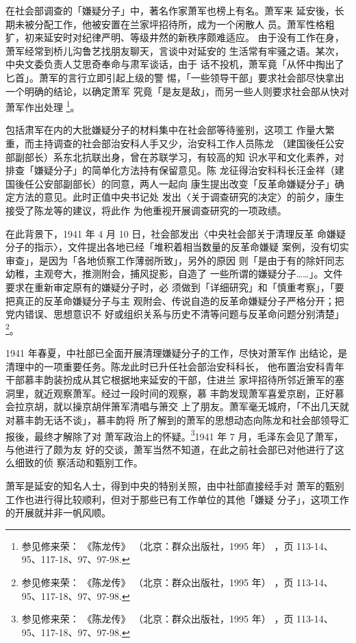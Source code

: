 在社会部调查的「嫌疑分子」中，著名作家萧军也榜上有名。萧军来
延安後，长期未被分配工作，他被安置在兰家坪招待所，成为一个闲散人
员。萧军性格粗犷，初来延安时对纪律严明、等级井然的新秩序颇难适应。
由于没有工作在身，萧军经常到桥儿沟鲁艺找朋友聊天，言谈中对延安的
生活常有牢骚之语。某次，中央文委负责人艾思奇奉命与肃军谈话，由于
话不投机，萧军竟「从怀中掏出了匕首」。萧军的言行立即引起上级的警
惕，「一些领导干部」要求社会部尽快拿出一个明确的结论，以确定萧军
究竟「是友是敌」，而另一些人则要求社会部从快对萧军作出处理
\footnote{参见修来荣：
《陈龙传》
（北京：群众出版社，1995 年）
，页 113-14、95、117-18、97、97-98.}。

包括肃军在内的大批嫌疑分子的材料集中在社会部等待鉴别，这项工
作量大繁重，而主持调查的社会部治安科人手又少，治安科工作人员陈龙
（建国後任公安部副部长）系东北抗联出身，曾在苏联学习，有较高的知
识水平和文化素养，对排查「嫌疑分子」的简单化方法持有保留意见。陈
龙征得治安科科长汪金祥（建国後任公安部副部长）的同意，两人一起向
康生提出改变「反革命嫌疑分子」确定方法的意见。此时正值中央书记处
发出〈关于调查研究的决定〉的前夕，康生接受了陈龙等的建议，将此作
为他重视开展调查研究的一项政绩。

在此背景下，1941 年 4 月 10 日，社会部发出〈中央社会部关于清理反革
命嫌疑分子的指示〉，文件提出各地已经「堆积着相当数量的反革命嫌疑
案例，没有切实审查」，是因为「各地侦察工作薄弱所致」，另外的原因
则「是由于有的除奸同志幼稚，主观夸大，推测附会，捕风捉影，自造了
一些所谓的嫌疑分子……」。文件要求在重新审定原有的嫌疑分子时，必
须做到「详细研究」和「慎重考察」，「要把真正的反革命嫌疑分子与主
观附会、传说自造的反革命嫌疑分子严格分开；把党内错误、思想意识不
好或组织关系与历史不清等问题与反革命问题分别清楚」\footnote{参见修来荣：
《陈龙传》
（北京：群众出版社，1995 年）
，页 113-14、95、117-18、97、97-98.}。

1941 年春夏，中社部已全面开展清理嫌疑分子的工作，尽快对萧军作
出结论，是清理中的一项重要任务。陈龙此时已升任社会部治安科科长，
他布置治安科青年干部慕丰韵装扮成从其它根据地来延安的干部，住进兰
家坪招待所邻近箫军的塞洞里，就近观察萧军。经过一段时间的观察，慕
丰韵发现萧军喜爱京剧，正好慕会拉京胡，就以操京胡伴箫军清唱与箫交
上了朋友。萧军毫无城府，「不出几天就对慕丰韵无话不谈」，慕丰韵将
所了解到的萧军的思想动态向陈龙和社会部领导汇报後，最终才解除了对
萧军政治上的怀疑。\footnote{参见修来荣：
《陈龙传》
（北京：群众出版社，1995 年）
，页 113-14、95、117-18、97、97-98.}1941 年 7 月，毛泽东会见了萧军，与他进行了颇为友
好的交谈，萧军当然不知道，在此之前社会部已对他进行了这么细致的侦
察活动和甄别工作。

萧军是延安的知名人士，得到中央的特别关照，由中社部直接经手对
萧军的甄别工作也进行得比较顺利，但对于那些已有工作单位的其他「嫌疑
分子」，这项工作的开展就并非一帆风顺。

